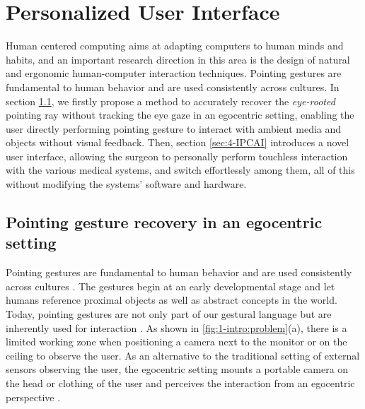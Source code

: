 %
\chapter{Personalized User Interface} \label{chapter:4}
Human centered computing aims at adapting computers to human minds and habits, and an important research direction in this area is the design of natural and ergonomic human-computer interaction techniques.
Pointing gestures are fundamental to human behavior and are used consistently across cultures.
In section \ref{section:4-PAST}, we firstly propose a method to accurately recover the \textit{eye-rooted} pointing ray without tracking the eye gaze in an egocentric setting, enabling the user directly performing pointing gesture to interact with ambient media and objects without visual feedback. 
Then, section \ref{sec:4-IPCAI} introduces a novel user interface, allowing the surgeon to personally perform touchless interaction with the various medical systems, and switch effortlessly among them, all of this without modifying the systems' software and hardware.

\section{Pointing gesture recovery in an egocentric setting}
\label{section:4-PAST}
Pointing gestures are fundamental to human behavior \citep{Matthews2012} and are used consistently across cultures  \citep{McNeill2000}. The gestures begin at an early developmental stage \citep{Carpendale2010} and let humans reference proximal objects as well as abstract concepts in the world. Today, pointing gestures are not only part of our gestural language but are inherently used for interaction \citep{Nanayakkara2013a}.
As shown in \figurename{\ref{fig:1-intro:problem}(a)}, there is a limited working zone when positioning a camera next to the monitor or on the ceiling to observe the user.
As an alternative to the traditional setting of external sensors observing the user, the egocentric setting mounts a portable camera on the head or clothing of the user and perceives the interaction from an egocentric perspective \citep{Fathi2011,Li2015}. 
 
